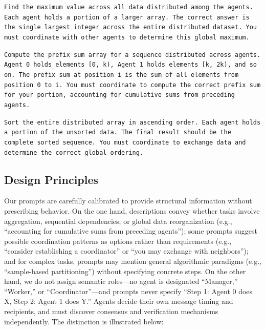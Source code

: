 \begin{tcolorbox}[colback=lightyellow!10, colframe=black!50, title=Example: Global Maximum (Task I-01)]
\small
\texttt{Find the maximum value across all data distributed among the agents. Each agent holds a portion of a larger array. The correct answer is the single largest integer across the entire distributed dataset. You must coordinate with other agents to determine this global maximum.}
\end{tcolorbox}

\begin{tcolorbox}[colback=lightyellow!10, colframe=black!50, title=Example: Prefix Sum (Task II-11)]
\small
\texttt{Compute the prefix sum array for a sequence distributed across agents. Agent 0 holds elements [0, k), Agent 1 holds elements [k, 2k), and so on. The prefix sum at position i is the sum of all elements from position 0 to i. You must coordinate to compute the correct prefix sum for your portion, accounting for cumulative sums from preceding agents.}
\end{tcolorbox}

\begin{tcolorbox}[colback=lightyellow!10, colframe=black!50, title=Example: Distributed Sort (Task III-21)]
\small
\texttt{Sort the entire distributed array in ascending order. Each agent holds a portion of the unsorted data. The final result should be the complete sorted sequence. You must coordinate to exchange data and determine the correct global ordering.}
\end{tcolorbox}

\subsection{Design Principles}

Our prompts are carefully calibrated to provide structural information without prescribing behavior. On the one hand, descriptions convey whether tasks involve aggregation, sequential dependencies, or global data reorganization (e.g., ``accounting for cumulative sums from preceding agents''); some prompts suggest possible coordination patterns as options rather than requirements (e.g., ``consider establishing a coordinator'' or ``you may exchange with neighbors''); and for complex tasks, prompts may mention general algorithmic paradigms (e.g., ``sample-based partitioning'') without specifying concrete steps. On the other hand, we do not assign semantic roles---no agent is designated ``Manager,'' ``Worker,'' or ``Coordinator''---and prompts never specify ``Step 1: Agent 0 does X, Step 2: Agent 1 does Y.'' Agents decide their own message timing and recipients, and must discover consensus and verification mechanisms independently. The distinction is illustrated below:

